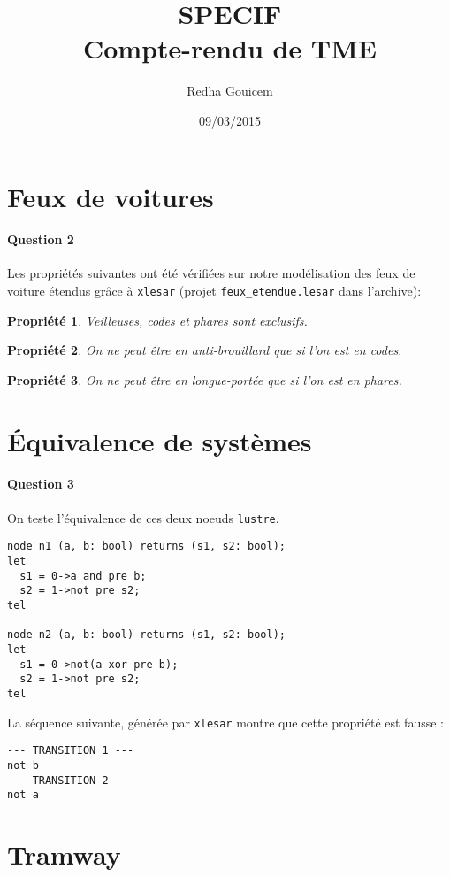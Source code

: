 \documentclass[a4paper, 11pt]{article}
\newtheorem{propriete}{Propriété}
\begin{document}
 
\title{SPECIF\\Compte-rendu de TME}
\author{Redha Gouicem}
\date{09/03/2015}
 
\maketitle

\section{Feux de voitures}
\paragraph{Question 2}
Les propriétés suivantes ont été vérifiées sur notre modélisation des feux de voiture étendus grâce à \texttt{xlesar} (projet \texttt{feux\_etendue.lesar} dans l'archive):
\begin{propriete}
 Veilleuses, codes et phares sont exclusifs.
\end{propriete}
\begin{propriete}
  On ne peut être en anti-brouillard que si l'on est en codes.
\end{propriete}
\begin{propriete}
  On ne peut être en longue-portée que si l'on est en phares.
\end{propriete}

\section{\'Equivalence de systèmes}
\paragraph{Question 3}
On teste l'équivalence de ces deux noeuds \texttt{lustre}.
\begin{verbatim}
node n1 (a, b: bool) returns (s1, s2: bool);
let
  s1 = 0->a and pre b;
  s2 = 1->not pre s2;
tel

node n2 (a, b: bool) returns (s1, s2: bool);
let
  s1 = 0->not(a xor pre b);
  s2 = 1->not pre s2;
tel
\end{verbatim}
La séquence suivante, générée par \texttt{xlesar} montre que cette propriété est fausse :

\begin{verbatim}
--- TRANSITION 1 ---
not b
--- TRANSITION 2 ---
not a
\end{verbatim}

\section{Tramway}
\end{document}
